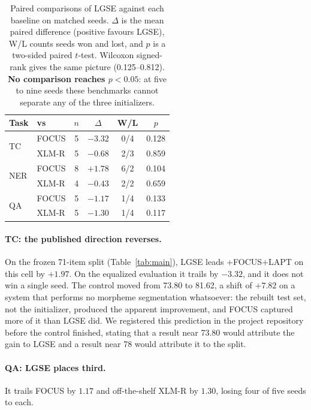 \documentclass[11pt]{article}
\begin{document}
\begin{table}[t]
\centering
\small
\begin{tabular}{llcccc}
\toprule
Task & vs & $n$ & $\Delta$ & W/L & $p$ \\
\midrule
\multirow{2}{*}{TC}  & FOCUS  & 5 & $-3.32$ & 0/4 & 0.128 \\
                     & XLM-R  & 5 & $-0.68$ & 2/3 & 0.859 \\
\midrule
\multirow{2}{*}{NER} & FOCUS  & 8 & $+1.78$ & 6/2 & 0.104 \\
                     & XLM-R  & 4 & $-0.43$ & 2/2 & 0.659 \\
\midrule
\multirow{2}{*}{QA}  & FOCUS  & 5 & $-1.17$ & 1/4 & 0.133 \\
                     & XLM-R  & 5 & $-1.30$ & 1/4 & 0.117 \\
\bottomrule
\end{tabular}
\caption{Paired comparisons of LGSE against each baseline on matched seeds.
$\Delta$ is the mean paired difference (positive favours LGSE), W/L counts
seeds won and lost, and $p$ is a two-sided paired $t$-test. Wilcoxon
signed-rank gives the same picture (0.125--0.812). \textbf{No comparison
reaches $p < 0.05$}: at five to nine seeds these benchmarks cannot separate
any of the three initializers.}
\label{tab:tests}
\end{table}

\paragraph{TC: the published direction reverses.} On the frozen 71-item split
(Table~\ref{tab:main}), LGSE leads \textsc{+FOCUS+LAPT} on this cell by
$+1.97$. On the equalized evaluation it trails by $-3.32$, and it does not
win a single seed. The control moved from 73.80 to 81.62, a shift of $+7.82$
on a system that performs no morpheme segmentation whatsoever: the rebuilt
test set, not the initializer, produced the apparent improvement, and FOCUS
captured more of it than LGSE did. We registered this prediction in the
project repository before the control finished, stating that a result near
73.80 would attribute the gain to LGSE and a result near 78 would attribute
it to the split.

\paragraph{QA: LGSE places third.} It trails FOCUS by $1.17$ and
off-the-shelf XLM-R by $1.30$, losing four of five seeds to each.
\end{document}
